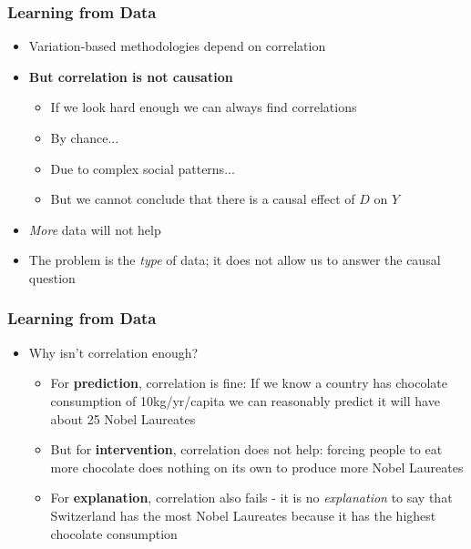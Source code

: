 \documentclass[xcolor=x11names,compress]{beamer}\usepackage[]{graphicx}\usepackage[]{xcolor}
\renewcommand{\(}{\begin{columns}}
\renewcommand{\)}{\end{columns}}
\newcommand{\<}[1]{\begin{column}{#1}}
\renewcommand{\>}{\end{column}}
\begin{document}
\begin{frame}
\frametitle{Learning from Data}
\begin{itemize}
\item Variation-based methodologies depend on correlation
\pause
\item \textbf{But correlation is not causation}
\pause
\begin{itemize}
\item If we look hard enough we can always find correlations
\pause
\item By chance...
\pause
\item Due to complex social patterns...
\pause
\item But we cannot conclude that there is a causal effect of $D$ on $Y$
\pause
\end{itemize}
\item \textit{More} data will not help
\pause
\item The problem is the \textit{type} of data; it does not allow us to answer the causal question 
\end{itemize}
\end{frame}







\begin{frame}
\frametitle{Learning from Data}
\begin{itemize}
\item Why isn't correlation enough?
\pause
\begin{itemize}
\item For \textbf{prediction}, correlation is fine: If we know a country has chocolate consumption of 10kg/yr/capita we can reasonably predict it will have about 25 Nobel Laureates
\pause
\item But for \textbf{intervention}, correlation does not help: forcing people to eat more chocolate does nothing on its own to produce more Nobel Laureates
\pause
\item For \textbf{explanation}, correlation also fails - it is no \textit{explanation} to say that Switzerland has the most Nobel Laureates because it has the highest chocolate consumption
\end{itemize}
\end{itemize}
\end{frame}
\end{document}

